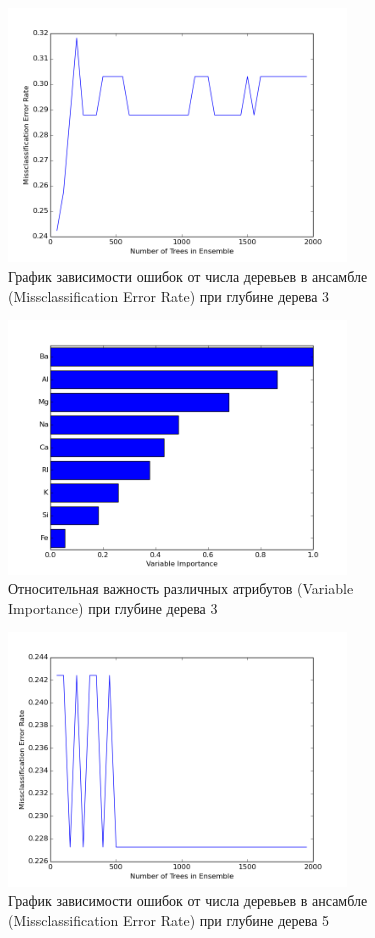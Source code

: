 \documentclass{article} %
\begin{document}
\begin{figure}[H]
    \centering
    \includegraphics[width=0.8\textwidth]{mer3depth}
    \caption{График зависимости ошибок от числа деревьев в ансамбле
    (Missclassification Error Rate) при глубине дерева 3}
\end{figure}

\begin{figure}[H]
    \centering
    \includegraphics[width=0.8\textwidth]{varImp3depth}
    \caption{Относительная важность различных атрибутов
    (Variable Importance) при глубине дерева 3}
\end{figure}

\begin{figure}[H]
    \centering
    \includegraphics[width=0.8\textwidth]{mer5depth}
    \caption{График зависимости ошибок от числа деревьев в ансамбле
    (Missclassification Error Rate) при глубине дерева 5}
\end{figure}
\end{document}
